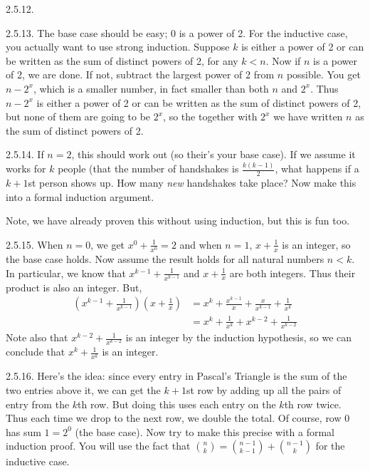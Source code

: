 \begin {itemize}
\begin{ans}{2.5.12.}
\end{ans}
\begin{ans}{2.5.13.}
		The base case should be easy; 0 is a power of 2.  For the inductive case, you actually want to use strong induction.  Suppose $k$ is either a power of 2 or can be written as the sum of distinct powers of 2, for any $k < n$.  Now if $n$ is a power of 2, we are done.  If not, subtract the largest power of 2 from $n$ possible.  You get $n - 2^x$, which is a smaller number, in fact smaller than both $n$ and $2^x$.  Thus $n-2^x$ is either a power of 2 or can be written as the sum of distinct powers of 2, but none of them are going to be $2^x$, so the together with $2^x$ we have written $n$ as the sum of distinct powers of 2.
	
\end{ans}
\begin{ans}{2.5.14.}
	  If $n = 2$, this should work out (so their's your base case).  If we assume it works for $k$ people (that the number of handshakes is $\frac{k(k-1)}{2}$, what happens if a $k+1$st person shows up.  How many {\em new} handshakes take place?  Now make this into a formal induction argument.

	  Note, we have already proven this without using induction, but this is fun too.
	
\end{ans}
\begin{ans}{2.5.15.}
		When $n = 0$, we get $x^0 +\frac{1}{x^0} = 2$ and when $n = 1$, $x + \frac{1}{x}$ is an integer, so the base case holds.  Now assume the result holds for all natural numbers $n < k$.  In particular, we know that $x^{k-1} + \frac{1}{x^{k-1}}$ and $x + \frac{1}{x}$ are both integers.  Thus their product is also an integer.  But,
		\begin{align*}
		\left(x^{k-1} + \frac{1}{x^{k-1}}\right)\left(x + \frac{1}{x}\right) & = x^k + \frac{x^{k-1}}{x} + \frac{x}{x^{k-1}} + \frac{1}{x^k}\\
		& = x^k + \frac{1}{x^k} + x^{k-2} + \frac{1}{x^{k-2}}
		\end{align*}
		Note also that $x^{k-2} + \frac{1}{x^{k-2}}$ is an integer by the induction hypothesis, so we can conclude that $x^k + \frac{1}{x^k}$ is an integer.


	
\end{ans}
\begin{ans}{2.5.16.}
		Here's the idea: since every entry in Pascal's Triangle is the sum of the two entries above it, we can get the $k+1$st row by adding up all the pairs of entry from the $k$th row.  But doing this uses each entry on the $k$th row twice.  Thus each time we drop to the next row, we double the total.  Of course, row 0 has sum $1 = 2^0$ (the base case).  Now try to make this precise with a formal induction proof.  You will use the fact that ${n \choose k} = {n-1 \choose k-1} + {n-1 \choose k}$ for the inductive case.
	

\end{ans}
\end{itemize}
